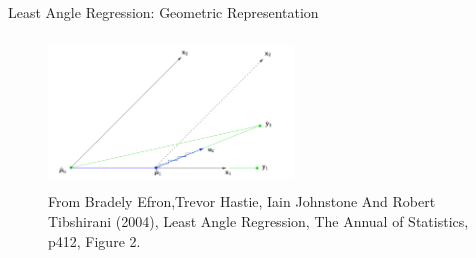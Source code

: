 \documentclass[handout]{beamer}
\begin{document}
\begin{frame}{Least Angle Regression: Geometric Representation}
\begin{figure}[h]
\centering
\includegraphics[width=6.5cm,height=4cm]{img/Geometric}
\caption{From Bradely Efron,Trevor Hastie, Iain Johnstone And Robert Tibshirani (2004),  Least Angle Regression, The Annual of Statistics, p412, Figure 2.}
\end{figure}
\end{frame}



\end{document}

